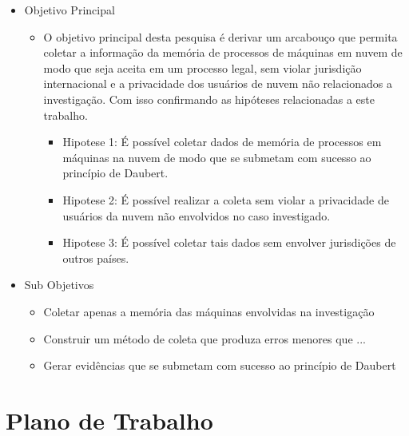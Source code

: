 \documentclass[
	12pt,				%
	openright,			%
	oneside,			%
	a4paper,			%
	english,			%
	french,				%
	spanish,			%
	brazil,				%
	]{abntex2}
\begin{document}
\begin{itemize}
 \item Objetivo Principal

 \begin{itemize}
  \item O objetivo principal desta pesquisa é derivar um arcabouço que permita coletar a informação da memória de processos de máquinas em nuvem de modo que seja aceita em um processo legal,
 sem violar jurisdição internacional e a privacidade dos usuários de nuvem não relacionados a investigação. Com isso confirmando as hipóteses relacionadas a este trabalho.
 
 \begin{itemize}
  \item Hipotese 1: É possível coletar dados de memória de processos em máquinas na nuvem de modo que se submetam com sucesso ao princípio de Daubert.
  \item Hipotese 2: É possível realizar a coleta sem violar a privacidade de usuários da nuvem não envolvidos no caso investigado.
  \item Hipotese 3: É possível coletar tais dados sem envolver jurisdições de outros países.
 \end{itemize}
 
 \end{itemize}
 
\end{itemize}

\begin{itemize}
 \item Sub Objetivos

 \begin{itemize}
  \item Coletar apenas a memória das máquinas envolvidas na investigação
  \item Construir um método de coleta que produza erros menores que ...
  \item Gerar evidências que se submetam com sucesso ao princípio de Daubert
 \end{itemize}
 
\end{itemize}

\chapter{Plano de Trabalho}
\end{document}
